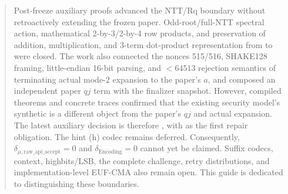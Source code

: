 \documentclass[11pt,a4paper]{article}
\begin{document}
\begin{abstract}
Post-freeze auxiliary proofs advanced the NTT/Rq boundary without retroactively
extending the frozen paper. Odd-root/full-NTT spectral action, mathematical
2-by-3/2-by-4 row products, and preservation of addition, multiplication, and
3-term dot-product representation from  to
 were closed. The work also connected the nonces
515/516, SHAKE128 framing, little-endian 16-bit parsing, and \(<64513\) rejection
semantics of terminating actual mode-2  expansion to the
paper's \(a\), and composed an independent paper \(qj\) term with the finalizer
snapshot. However, compiled theorems and concrete traces confirmed that the
existing security model's synthetic  is a
different object from the paper's \(qj\) and actual expansion. The latest
auxiliary decision is therefore , with
 as the first repair obligation.
The hint (h) codec remains deferred.
Consequently,
\(\delta_{\mu,\mathrm{raw\_api\_accept}}=0\) and
\(\delta_{\mathrm{Encoding}}=0\) cannot yet be claimed. Suffix codecs, context,
highbits/LSB, the complete challenge, retry distributions, and implementation-level
EUF-CMA also remain open. This guide is dedicated to distinguishing these boundaries.
\end{abstract}
\end{document}
